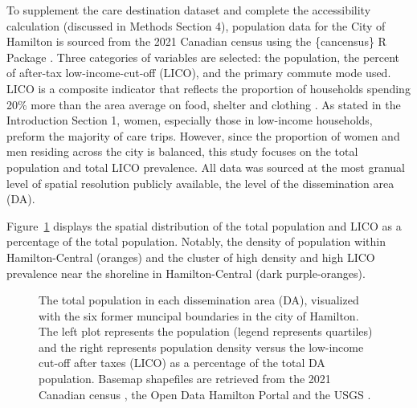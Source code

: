 \documentclass[
  authoryear,
  preprint,
  3p]{elsarticle}
\begin{document}
To supplement the care destination dataset and complete the
accessibility calculation (discussed in Methods Section 4), population
data for the City of Hamilton is sourced from the 2021 Canadian census
using the \{cancensus\} R Package
\citep{governmentofcanadaCensusPopulation2023, vonbergmannCancensusCensusMapper2021}.
Three categories of variables are selected: the population, the percent
of after-tax low-income-cut-off (LICO), and the primary commute mode
used. LICO is a composite indicator that reflects the proportion of
households spending 20\% more than the area average on food, shelter and
clothing \citep{governmentofcanadaLowIncomeCutoffs2023}. As stated in
the Introduction Section 1, women, especially those in low-income
households, preform the majority of care trips. However, since the
proportion of women and men residing across the city is balanced, this
study focuses on the total population and total LICO prevalence. All
data was sourced at the most granual level of spatial resolution
publicly available, the level of the dissemination area (DA).

Figure~\ref{fig-Fig3} displays the spatial distribution of the total
population and LICO as a percentage of the total population. Notably,
the density of population within Hamilton-Central (oranges) and the
cluster of high density and high LICO prevalence near the shoreline in
Hamilton-Central (dark purple-oranges).

\begin{figure}


\caption{\label{fig-Fig3}The total population in each dissemination area
(DA), visualized with the six former muncipal boundaries in the city of
Hamilton. The left plot represents the population (legend represents
quartiles) and the right represents population density versus the
low-income cut-off after taxes (LICO) as a percentage of the total DA
population. Basemap shapefiles are retrieved from the 2021 Canadian
census \citep{governmentofcanadaCensusPopulation2023}, the Open Data
Hamilton Portal \citep{opendatahamiltonCityBoundary2023} and the USGS
\citep{greatlakesUSGS2010}.}

\end{figure}%
\end{document}
